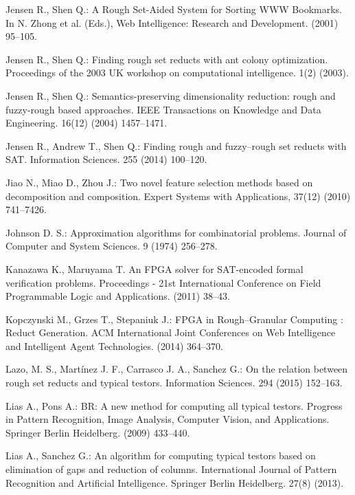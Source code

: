 \documentclass[11pt]{article}   %
\begin{document}
\begin{thebibliography}{}
	Jensen R., Shen Q.:
	A Rough Set-Aided System for Sorting WWW Bookmarks. 
	In N. Zhong et al. (Eds.), Web Intelligence: Research and Development. (2001) 95--105.	
	
	Jensen R., Shen Q.:
	Finding rough set reducts with ant colony optimization.
	Proceedings of the 2003 UK workshop on computational intelligence. 1(2) (2003).

	Jensen R., Shen Q.:
	Semantics-preserving dimensionality reduction: rough and fuzzy-rough based approaches.
	IEEE Transactions on Knowledge and Data Engineering. 16(12) (2004) 1457--1471.
	
	Jensen R., Andrew T., Shen Q.:
	Finding rough and fuzzy--rough set reducts with SAT.
	Information Sciences. 255 (2014) 100--120.
	
	Jiao N., Miao D., Zhou J.:
 	Two novel feature selection methods based on decomposition and composition.
 	Expert Systems with Applications, 37(12) (2010) 741--7426.
 	
	Johnson D. S.:
	Approximation algorithms for combinatorial problems. 
	Journal of Computer and System Sciences. 9 (1974) 256--278.

	Kanazawa K., Maruyama T.
	An FPGA solver for SAT-encoded formal verification problems. 
	Proceedings - 21st International Conference on Field Programmable Logic and Applications. (2011) 38--43.

	Kopczynski M., Grzes T., Stepaniuk J.:
	FPGA in Rough--Granular Computing : Reduct Generation.
	ACM International Joint Conferences on Web Intelligence and Intelligent Agent Technologies. (2014) 364--370. 

	Lazo, M. S., Martínez J. F., Carrasco J. A., Sanchez G.:
	On the relation between rough set reducts and typical testors.
	Information Sciences. 294 (2015) 152--163.

	 Lias A., Pons A.:
	 BR: A new method for computing all typical testors.
	 Progress in Pattern Recognition, Image Analysis, Computer Vision, and Applications. 
	 Springer Berlin Heidelberg. (2009) 433--440.

	 Lias A., Sanchez G.:
	 An algorithm for computing typical testors based on elimination of gaps and reduction of columns.
	 International Journal of Pattern Recognition and Artificial Intelligence. 
	 Springer Berlin Heidelberg. 27(8) (2013).
	 

\end{thebibliography}
\end{document}
